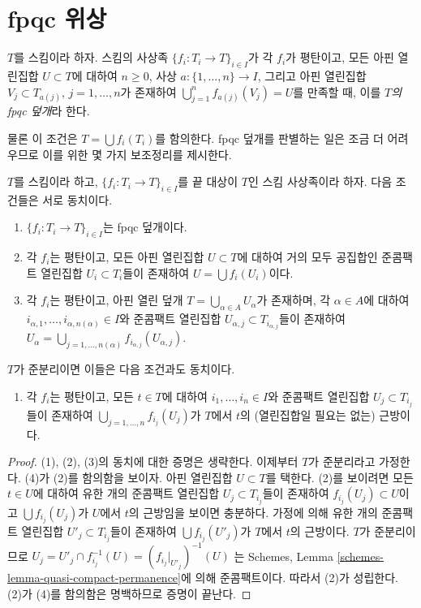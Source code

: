 \section{fpqc 위상}
\label{section-fpqc}

\begin{definition}
\label{definition-fpqc-covering}
$T$를 스킴이라 하자. 스킴의 사상족
$\{f_i : T_i \to T\}_{i \in I}$가 각 $f_i$가 평탄이고, 모든 아핀
열린집합 $U \subset T$에 대하여 $n \geq 0$, 사상
$a : \{1, \ldots, n\} \to I$, 그리고 아핀 열린집합
$V_j \subset T_{a(j)}$, $j = 1, \ldots, n$가 존재하여
$\bigcup_{j = 1}^n f_{a(j)}(V_j) = U$를 만족할 때, 이를
{\it $T$의 fpqc 덮개}라 한다.
\end{definition}

\noindent
물론 이 조건은 $T = \bigcup f_i(T_i)$를 함의한다. fpqc 덮개를
판별하는 일은 조금 더 어려우므로 이를 위한 몇 가지 보조정리를 제시한다.

\begin{lemma}
\label{lemma-recognize-fpqc-covering}
$T$를 스킴이라 하고, $\{f_i : T_i \to T\}_{i \in I}$를 끝 대상이
$T$인 스킴 사상족이라 하자. 다음 조건들은 서로 동치이다.
\begin{enumerate}
\item $\{f_i : T_i \to T\}_{i \in I}$는 fpqc 덮개이다.
\item 각 $f_i$는 평탄이고, 모든 아핀 열린집합 $U \subset T$에 대하여
거의 모두 공집합인 준콤팩트 열린집합 $U_i \subset T_i$들이 존재하여
$U = \bigcup f_i(U_i)$이다.
\item 각 $f_i$는 평탄이고, 아핀 열린 덮개
$T = \bigcup_{\alpha \in A} U_\alpha$가 존재하며, 각 $\alpha \in A$에
대하여 $i_{\alpha, 1}, \ldots, i_{\alpha, n(\alpha)} \in I$와 준콤팩트
열린집합 $U_{\alpha, j} \subset T_{i_{\alpha, j}}$들이 존재하여
$U_\alpha =
\bigcup_{j = 1, \ldots, n(\alpha)} f_{i_{\alpha, j}}(U_{\alpha, j})$.
\end{enumerate}
$T$가 준분리이면 이들은 다음 조건과도 동치이다.
\begin{enumerate}
\item[(4)] 각 $f_i$는 평탄이고, 모든 $t \in T$에 대하여
$i_1, \ldots, i_n \in I$와 준콤팩트 열린집합 $U_j \subset T_{i_j}$들이
존재하여 $\bigcup_{j = 1, \ldots, n} f_{i_j}(U_j)$가 $T$에서 $t$의
(열린집합일 필요는 없는) 근방이다.
\end{enumerate}
\end{lemma}

\begin{proof}
(1), (2), (3)의 동치에 대한 증명은 생략한다. 이제부터 $T$가
준분리라고 가정한다. (4)가 (2)를 함의함을 보이자. 아핀 열린집합
$U \subset T$를 택한다. (2)를 보이려면 모든 $t \in U$에 대하여
유한 개의 준콤팩트 열린집합 $U_j \subset T_{i_j}$들이 존재하여
$f_{i_j}(U_j) \subset U$이고 $\bigcup f_{i_j}(U_j)$가 $U$에서 $t$의
근방임을 보이면 충분하다. 가정에 의해 유한 개의 준콤팩트 열린집합
$U'_j \subset T_{i_j}$들이 존재하여
$\bigcup f_{i_j}(U'_j)$가 $T$에서 $t$의 근방이다. $T$가 준분리이므로
$U_j = U'_j \cap f_{i_j}^{-1}(U) = (f_{i_j}|_{U'_j})^{-1}(U)$
는 Schemes, Lemma \ref{schemes-lemma-quasi-compact-permanence}에 의해
준콤팩트이다. 따라서 (2)가 성립한다. (2)가 (4)를 함의함은 명백하므로
증명이 끝난다.
\end{proof}

